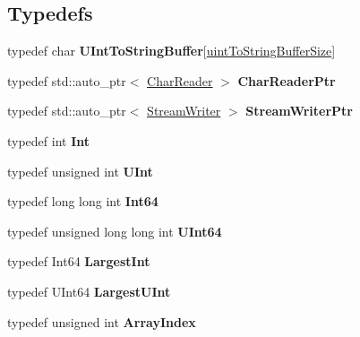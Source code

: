 \subsection*{Typedefs}
\begin{DoxyCompactItemize}
\item 
typedef char {\bfseries U\+Int\+To\+String\+Buffer}\mbox{[}\hyperlink{namespace_json_a0c5f614b019f20b4598dcaec09d9e820ae4f2008c7919f20d81286121d1374424}{uint\+To\+String\+Buffer\+Size}\mbox{]}\hypertarget{namespace_json_a602bcf69c2042fb61c3b243cb16f04ca}{}\label{namespace_json_a602bcf69c2042fb61c3b243cb16f04ca}

\item 
typedef std\+::auto\+\_\+ptr$<$ \hyperlink{class_json_1_1_char_reader}{Char\+Reader} $>$ {\bfseries Char\+Reader\+Ptr}\hypertarget{namespace_json_a4724efb8d41614b47036cb8b54233837}{}\label{namespace_json_a4724efb8d41614b47036cb8b54233837}

\item 
typedef std\+::auto\+\_\+ptr$<$ \hyperlink{class_json_1_1_stream_writer}{Stream\+Writer} $>$ {\bfseries Stream\+Writer\+Ptr}\hypertarget{namespace_json_a7132404aeebfc96d7c6ad2c66260afb5}{}\label{namespace_json_a7132404aeebfc96d7c6ad2c66260afb5}

\item 
typedef int {\bfseries Int}\hypertarget{namespace_json_a08122e8005b706d982e48cca1e2119c7}{}\label{namespace_json_a08122e8005b706d982e48cca1e2119c7}

\item 
typedef unsigned int {\bfseries U\+Int}\hypertarget{namespace_json_a800fb90eb6ee8d5d62b600c06f87f7d4}{}\label{namespace_json_a800fb90eb6ee8d5d62b600c06f87f7d4}

\item 
typedef long long int {\bfseries Int64}\hypertarget{namespace_json_ab7b47d2905da3b4ae60e4e800ec9ae5f}{}\label{namespace_json_ab7b47d2905da3b4ae60e4e800ec9ae5f}

\item 
typedef unsigned long long int {\bfseries U\+Int64}\hypertarget{namespace_json_a01f20bce8f8229f38ff890168c0e6452}{}\label{namespace_json_a01f20bce8f8229f38ff890168c0e6452}

\item 
typedef Int64 {\bfseries Largest\+Int}\hypertarget{namespace_json_a218d880af853ce786cd985e82571d297}{}\label{namespace_json_a218d880af853ce786cd985e82571d297}

\item 
typedef U\+Int64 {\bfseries Largest\+U\+Int}\hypertarget{namespace_json_ae202ecad69725e23443f465e257456d0}{}\label{namespace_json_ae202ecad69725e23443f465e257456d0}

\item 
typedef unsigned int {\bfseries Array\+Index}\hypertarget{namespace_json_a8048e741f2177c3b5d9ede4a5b8c53c2}{}\label{namespace_json_a8048e741f2177c3b5d9ede4a5b8c53c2}

\end{DoxyCompactItemize}
